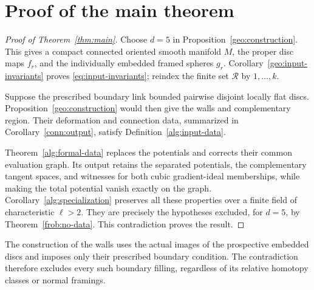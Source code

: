 \section{Proof of the main theorem}\label{sec:conclusion}
\begin{proof}[Proof of Theorem~\ref{thm:main}]
Choose $d=5$ in Proposition~\ref{geo:construction}. This gives a compact
connected oriented smooth manifold $M$, the proper disc maps $f_r$,
and the individually embedded framed spheres $g_r$.
Corollary~\ref{geo:input-invariants} proves
\eqref{eq:input-invariants}; reindex the finite set $\mathcal R$ by
$1,\ldots,k$.

Suppose the prescribed boundary link bounded pairwise disjoint locally
flat discs. Proposition~\ref{geo:construction} would then give the
walls and complementary region. Their deformation and connection
data, summarized in Corollary~\ref{conn:output}, satisfy
Definition~\ref{alg:input-data}.

Theorem~\ref{alg:formal-data} replaces the potentials and corrects
their common evaluation graph. Its output retains the separated
potentials, the complementary tangent spaces, and witnesses for both
cubic gradient-ideal memberships, while making the total potential
vanish exactly on the graph. Corollary~\ref{alg:specialization}
preserves all these properties over a finite field of characteristic
$\ell>2$. They are precisely the hypotheses excluded, for $d=5$, by
Theorem~\ref{frob:no-data}. This contradiction proves the result.
\end{proof}

The construction of the walls uses the actual images of the
prospective embedded discs and imposes only their prescribed boundary
condition. The contradiction therefore excludes every such boundary
filling, regardless of its relative homotopy classes or normal
framings.
